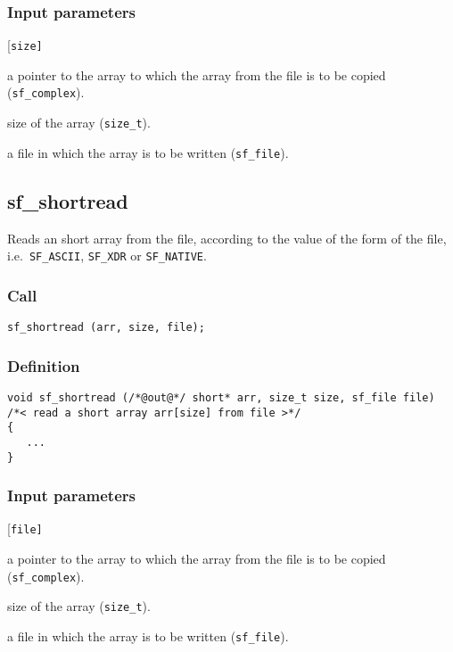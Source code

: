 \subsubsection*{Input parameters}
\begin{desclist}{\tt }{\quad}[\tt size]
   \setlength\itemsep{0pt}
   \item[arr]  a pointer to the array to which the array from the file is to be copied (\texttt{sf\_complex}). 
   \item[size] size of the array (\texttt{size\_t}). 
   \item[file] a file in which the array is to be written (\texttt{sf\_file}).
\end{desclist}




\subsection{{sf\_shortread}}
Reads an short array from the file, according to the value of the form of the file, i.e.~\texttt{SF\_ASCII}, \texttt{SF\_XDR} or \texttt{SF\_NATIVE}.        

\subsubsection*{Call}
\begin{verbatim}sf_shortread (arr, size, file);\end{verbatim}

\subsubsection*{Definition}
\begin{verbatim}
void sf_shortread (/*@out@*/ short* arr, size_t size, sf_file file)
/*< read a short array arr[size] from file >*/
{
   ...
}
\end{verbatim}

\subsubsection*{Input parameters}
\begin{desclist}{\tt }{\quad}[\tt file]
   \setlength\itemsep{0pt}
   \item[arr ] a pointer to the array to which the array from the file is to be copied (\texttt{sf\_complex}). 
   \item[size] size of the array (\texttt{size\_t}). 
   \item[file] a file in which the array is to be written (\texttt{sf\_file}).
\end{desclist}




